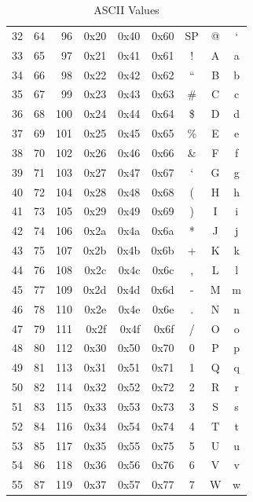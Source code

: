 \documentclass[12pt]{article}
\begin{document}
	\begin{table}[H]
	\begin{minipage}[t]{.55\linewidth}
	\centering
	\caption{ASCII Values \label{tab:ASCII}}
	\begin{tabular}{@{} r r r | >{\ttfamily}r >{\ttfamily}r >{\ttfamily}r | c c c @{}}\hline
	32	& 64	& 96		& 0x20	& 0x40	& 0x60	& SP		& @			& `\\
	33 	& 65	& 97		& 0x21	& 0x41	& 0x61	& ! 		& A 			& a\\
	34	& 66	& 98		& 0x22	& 0x42	& 0x62	& ``		& B 			& b\\
	35	& 67	& 99		& 0x23	& 0x43	& 0x63	& \#		& C 			& c\\
	36	& 68	& 100		& 0x24	& 0x44	& 0x64	& \$		& D 			& d\\
	37	& 69	& 101		& 0x25	& 0x45	& 0x65	& \%		& E 			& e\\
	38	& 70	& 102		& 0x26	& 0x46	& 0x66 	& \&		& F 			& f\\
	39	& 71	& 103		& 0x27	& 0x47	& 0x67	& `		& G 			& g\\
	40	& 72	& 104		& 0x28	& 0x48	& 0x68	& (		& H 			& h\\
	41	& 73	& 105 	& 0x29	& 0x49	& 0x69 	& )		& I 			& i\\
	42	& 74	& 106		& 0x2a	& 0x4a	& 0x6a	& *		& J			& j\\
	43	& 75	& 107		& 0x2b	& 0x4b	& 0x6b 	& +		& K			& k\\
	44	& 76	& 108		& 0x2c	& 0x4c	& 0x6c	& ,		& L 			& l\\
	45	& 77	& 109		& 0x2d	& 0x4d	& 0x6d	& - 		& M 			& m\\
	46	& 78	& 110		& 0x2e	&0x4e	& 0x6e	& .		& N 			& n\\
	47	& 79	& 111		& 0x2f	& 0x4f	& 0x6f	& /		& O			& o\\
	48	& 80	& 112		& 0x30	& 0x50	& 0x70	& 0		& P 			& p\\
	49	& 81	& 113		& 0x31	& 0x51	& 0x71	& 1		& Q 			& q\\
	50	& 82	& 114		& 0x32	& 0x52	& 0x72	& 2		& R 			& r\\
	51	& 83	& 115		& 0x33	& 0x53	& 0x73	& 3		& S 			& s\\
	52	& 84	& 116		& 0x34	& 0x54	& 0x74	& 4		& T 			& t\\
	53	& 85	& 117		& 0x35	& 0x55	& 0x75	& 5		& U 			& u\\
	54	& 86	& 118		& 0x36	& 0x56	& 0x76 	& 6		& V 			& v\\
	55	& 87	& 119		& 0x37	& 0x57	& 0x77	& 7		& W 			& w\\

\end{tabular}
\end{minipage}
\end{table}
\end{document}
